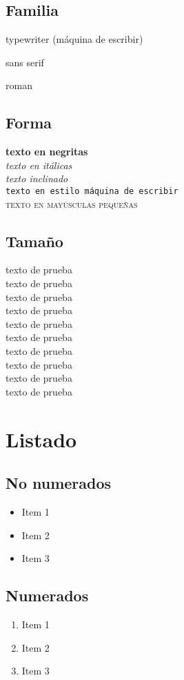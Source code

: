 \subsection{Familia}
{\ttfamily typewriter (máquina de escribir)}

{\sffamily sans serif}

{\rmfamily roman}

\subsection{Forma}
\textbf{texto en negritas}\\
\textit{texto en itálicas}\\
\textsl{texto inclinado}\\
\texttt{texto en estilo máquina de escribir}\\
\textsc{texto en mayúsculas pequeñas}

\subsection{Tamaño}
{\tiny texto de prueba}\\
{\scriptsize texto de prueba}\\
{\footnotesize texto de prueba}\\
{\small texto de prueba}\\
{\normalsize texto de prueba}\\
{\large texto de prueba}\\
{\Large texto de prueba}\\
{\LARGE texto de prueba}\\
{\huge texto de prueba}\\
{\Huge texto de prueba}

\section{Listado}

\subsection{No numerados}
\begin{itemize}
    \item Item 1
    \item Item 2
    \item Item 3
\end{itemize}

\subsection{Numerados}
\begin{enumerate}
    \item Item 1
    \item Item 2
    \item Item 3
\end{enumerate}


